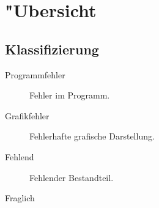%



\section{{"U}bersicht}
\label{Kapitel:Programmfehler:Uebersicht}








\subsection{Klassifizierung}
\label{Abschnitt:Programmfehler:Uebersicht:Klassifizierung}



\begin{description}

	\item[Programmfehler] Fehler im Programm.
	
	\item[Grafikfehler] Fehlerhafte grafische Darstellung.
	
	\item[Fehlend] Fehlender Bestandteil.
	
	\item[Fraglich]

\end{description}





